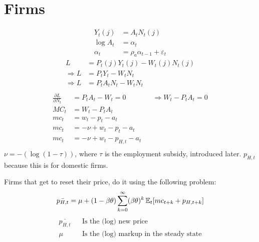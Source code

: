 \documentclass[12pt]{article}
\begin{document}
\section{Firms}
\begin{align}
    Y_t(j)   & = A_t N_t(j)                          \\
    \log A_t & = \alpha_t                            \\
    \alpha_t & = \rho_a \alpha_{t-1} + \varepsilon_t
\end{align}
\begin{align}
    L             & =P_{t}(j)Y_{t}(j) - W_t(j)N_{t}(j) \\
    \Rightarrow L & =P_{t}Y_{t} - W_tN_{t}             \\
    \Rightarrow L & =P_{t}A_t N_t - W_tN_{t}           \\
\end{align}
\begin{align}
    \frac{\partial L}{\partial N_t} & = P_t A_t - W_t = 0          &  & \Rightarrow W_t - P_tA_t = 0 \\
    MC_t                            & = W_t - P_tA_t                                                 \\
    mc_t                            & = w_t - p_t - a_t                                              \\
    mc_t                            & = -\nu + w_t - p_t - a_t                                       \\
    mc_t                            & = -\nu + w_t - p_{H,t} - a_t                                   \\
\end{align}
$\nu=-(\log (1-\tau))$, where $\tau$ is the employment subsidy, introduced later. $p_{H,t}$ because this is for domestic firms.

Firms that get to reset their price, do it using the following problem:
\begin{equation}
    \bar{p_{H,t}} = \mu + (1-\beta \theta) \sum_{k=0}^{\infty} (\beta \theta)^{k} \operatorname{\mathbb{E}}_t [mc_{t+k} + p_{H,t+k}]
\end{equation}
\begin{align}
    \bar{p_{H,t}} &  & \text{Is the (log) new price}                  \\
    \mu           &  & \text{Is the (log) markup in the steady state}
\end{align}
\end{document}
